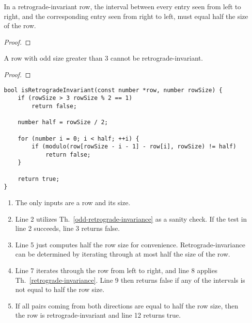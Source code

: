 \begin{lemma}
	\label{retrograde-invariance}
	In a retrograde-invariant row, the interval between every entry seen from left to right, and the corresponding entry seen from right to left, must equal half the size of the row.
	\begin{proof}
	\end{proof}
\end{lemma}

\begin{corollary}
	\label{odd-retrograde-invariance}
	A row with odd size greater than $3$ cannot be retrograde-invariant.
	\begin{proof}
	\end{proof}
\end{corollary}

\begin{lstlisting}[caption={Determining whether a row is retrograde-invariant.},label={isRetrogradeInvariant}]
bool isRetrogradeInvariant(const number *row, number rowSize) {
    if (rowSize > 3 rowSize % 2 == 1)
        return false;

    number half = rowSize / 2;

    for (number i = 0; i < half; ++i) {
        if (modulo(row[rowSize - i - 1] - row[i], rowSize) != half)
            return false;
    }

    return true;
}
\end{lstlisting}

\begin{enumerate}
\item The only inputs are a row and its size.
\item Line 2 utilizes Th.~\ref{odd-retrograde-invariance} as a sanity check. If the test in line 2 succeeds, line 3 returns false.
\addtocounter{enumi}{2}
\item Line 5 just computes half the row size for convenience. Retrograde-invariance can be determined by iterating through at most half the size of the row.
\addtocounter{enumi}{1}
\item Line 7 iterates through the row from left to right, and line 8 applies Th.~\ref{retrograde-invariance}. Line 9 then returns false if any of the intervals is not equal to half the row size.
\addtocounter{enumi}{4}
\item If all pairs coming from both directions are equal to half the row size, then the row is retrograde-invariant and line 12 returns true.
\end{enumerate}


